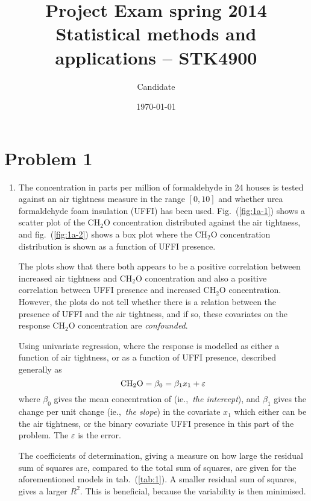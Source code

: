 \documentclass[a4paper,11pt]{article}
\date{\today}
\title{Project Exam spring 2014\\ \small{Statistical methods and applications -- STK4900}}
\author{Candidate}
\newcommand{\CHHO}{\text{CH\ensuremath{_2}O} }
\begin{document}
\onecolumn
\maketitle{}


\section*{Problem 1}

\begin{enumerate}[label=\alph*)]
    \item The concentration in parts per million of formaldehyde in 24 houses is tested against an air tightness measure in the range $[0,10]$ and whether urea formaldehyde foam insulation (UFFI) has been used. Fig.~(\ref{fig:1a-1}) shows a scatter plot of the CH$_2$O concentration distributed against the air tightness, and fig.~(\ref{fig:1a-2}) shows a box plot where the CH$_2$O concentration distribution is shown as a function of UFFI presence. 

        The plots show that there both appears to be a positive correlation between increased air tightness and CH$_2$O concentration and also a positive correlation between UFFI presence and increased CH$_2$O concentration. However, the plots do not tell whether there is a relation between the presence of UFFI and the air tightness, and if so, these covariates on the response CH$_2$O concentration are \textit{confounded}. 

        Using univariate regression, where the response \CHHO is modelled as either a function of air tightness, or as a function of UFFI presence, described generally as
        \begin{equation}
            {\rm CH_2O} = \beta_0 = \beta_1 x_1 + \varepsilon
            \label{eq:linmod}
        \end{equation}
        where $\beta_0$ gives the mean concentration of \CHHO (ie.,~\textit{the intercept}), and $\beta_1$ gives the change per unit change (ie.,~\textit{the slope}) in the covariate $x_1$ which either can be the air tightness, or the binary covariate UFFI presence in this part of the problem. The $\varepsilon$ is the error. 

        The coefficients of determination, giving a measure on how large the residual sum of squares are, compared to the total sum of squares, are given for the aforementioned models in tab.~(\ref{tab:1}). A smaller residual sum of squares, gives a larger $R^2$.  This is beneficial, because the variability is then minimised.


\end{enumerate}
\end{document}
